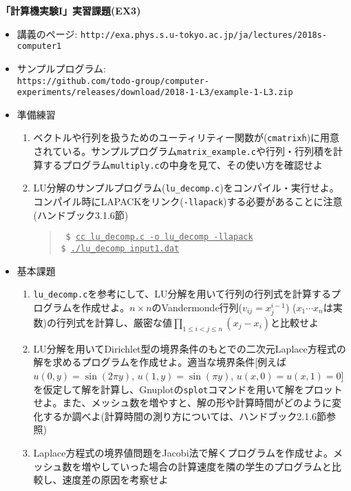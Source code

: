 \documentclass[11pt]{jarticle}
\begin{document}
\noindent
{\bf\large 「計算機実験I」実習課題(EX3)}
\\[-0.5em]

\noindent
\begin{itemize}
\item 講義のページ: \verb+http://exa.phys.s.u-tokyo.ac.jp/ja/lectures/2018s-computer1+

\item サンプルプログラム: \\ {\small \verb+https://github.com/todo-group/computer-experiments/releases/download/2018-1-L3/example-1-L3.zip+}
  
\item 準備練習
  \begin{enumerate}
  \item ベクトルや行列を扱うためのユーティリティー関数が({\tt cmatrix\.h})に用意されている。サンプルプログラム{\tt matrix\_example.c}や行列・行列積を計算するプログラム{\tt multiply.c}の中身を見て、その使い方を確認せよ
  \item LU分解のサンプルプログラム({\tt lu\_decomp.c})をコンパイル・実行せよ。コンパイル時にLAPACKをリンク({\tt -llapack})する必要があることに注意(ハンドブック3.1.6節)
    \begin{quote} \tt
      \$ \underline{cc lu\_decomp.c -o lu\_decomp -llapack} \\
      \$ \underline{./lu\_decomp input1.dat}
    \end{quote}
  \end{enumerate}

\item 基本課題
  \begin{enumerate}
  \item {\tt lu\_decomp.c}を参考にして、LU分解を用いて行列の行列式を計算するプログラムを作成せよ。$n \times n$のVandermonde行列($v_{ij}=x_j^{i-1}$) ($x_1 \cdots x_n$は実数)の行列式を計算し、厳密な値$\displaystyle \prod_{1 \le i < j \le n} (x_j-x_i)$と比較せよ
  \item LU分解を用いてDirichlet型の境界条件のもとでの二次元Laplace方程式の解を求めるプログラムを作成せよ。適当な境界条件[例えば$u(0,y) = \sin(2 \pi y)$, $u(1,y) = \sin(\pi y)$, $u(x,0)=u(x,1)=0$]を仮定して解を計算し、Gnuplotの{\tt splot}コマンドを用いて解をプロットせよ。また、メッシュ数を増やすと、解の形や計算時間がどのように変化するか調べよ(計算時間の測り方については、ハンドブック2.1.6節参照)
  \item Laplace方程式の境界値問題をJacobi法で解くプログラムを作成せよ。メッシュ数を増やしていった場合の計算速度を隣の学生のプログラムと比較し、速度差の原因を考察せよ
  \end{enumerate}
  

\end{itemize}
\end{document}
